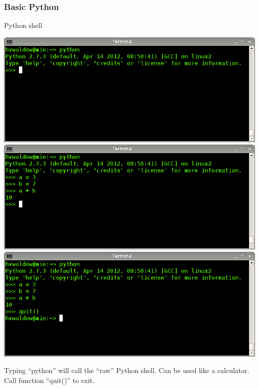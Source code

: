 \documentclass[xcolor=pdftex,dvipsnames,table]{beamer}
\begin{document}
\begin{frame}
  \frametitle{Basic Python}
  \begin{block}{Python shell}
    \begin{overprint}
    \includegraphics[width=\textwidth]{python1.png}
    \includegraphics[width=\textwidth]{python2.png}
    \includegraphics[width=\textwidth]{python3.png}
    \end{overprint}
    \begin{overprint}
       Typing ``python'' will call the ``raw'' Python shell.
       Can be used like a calculator.
       Call function ``quit()'' to exit.
    \end{overprint}   
  \end{block}
\end{frame}
\end{document}
